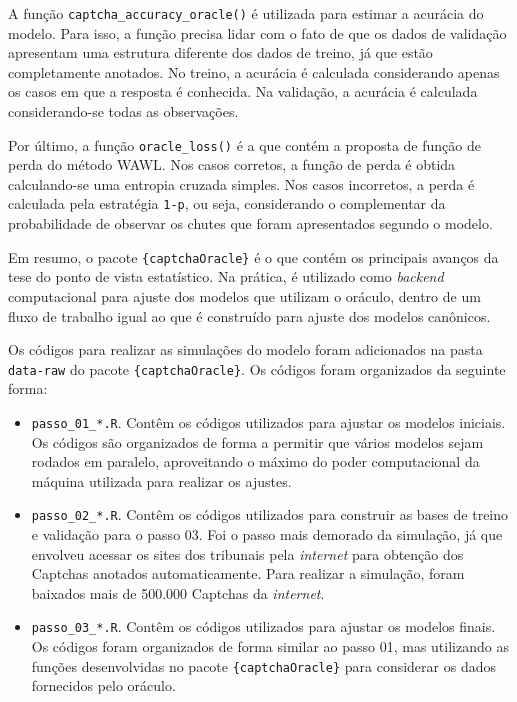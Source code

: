 \documentclass[12pt,twoside,brazilian]{book}
\providecommand{\tightlist}{%
  \setlength{\itemsep}{0pt}\setlength{\parskip}{0pt}}
\begin{document}
A função \texttt{captcha\_accuracy\_oracle()} é utilizada para estimar a
acurácia do modelo. Para isso, a função precisa lidar com o fato de que
os dados de validação apresentam uma estrutura diferente dos dados de
treino, já que estão completamente anotados. No treino, a acurácia é
calculada considerando apenas os casos em que a resposta é conhecida. Na
validação, a acurácia é calculada considerando-se todas as observações.

Por último, a função \texttt{oracle\_loss()} é a que contém a proposta
de função de perda do método WAWL. Nos casos corretos, a função de perda
é obtida calculando-se uma entropia cruzada simples. Nos casos
incorretos, a perda é calculada pela estratégia \texttt{1-p}, ou seja,
considerando o complementar da probabilidade de observar os chutes que
foram apresentados segundo o modelo.

Em resumo, o pacote \texttt{\{captchaOracle\}} é o que contém os
principais avanços da tese do ponto de vista estatístico. Na prática, é
utilizado como \emph{backend} computacional para ajuste dos modelos que
utilizam o oráculo, dentro de um fluxo de trabalho igual ao que é
construído para ajuste dos modelos canônicos.

Os códigos para realizar as simulações do modelo foram adicionados na
pasta \texttt{data-raw} do pacote \texttt{\{captchaOracle\}}. Os códigos
foram organizados da seguinte forma:

\begin{itemize}
\tightlist
\item
  \texttt{passo\_01\_*.R}. Contêm os códigos utilizados para ajustar os
  modelos iniciais. Os códigos são organizados de forma a permitir que
  vários modelos sejam rodados em paralelo, aproveitando o máximo do
  poder computacional da máquina utilizada para realizar os ajustes.
\item
  \texttt{passo\_02\_*.R}. Contêm os códigos utilizados para construir
  as bases de treino e validação para o passo 03. Foi o passo mais
  demorado da simulação, já que envolveu acessar os sites dos tribunais
  pela \emph{internet} para obtenção dos Captchas anotados
  automaticamente. Para realizar a simulação, foram baixados mais de
  500.000 Captchas da \emph{internet}.
\item
  \texttt{passo\_03\_*.R}. Contêm os códigos utilizados para ajustar os
  modelos finais. Os códigos foram organizados de forma similar ao passo
  01, mas utilizando as funções desenvolvidas no pacote
  \texttt{\{captchaOracle\}} para considerar os dados fornecidos pelo
  oráculo.
\end{itemize}
\end{document}

